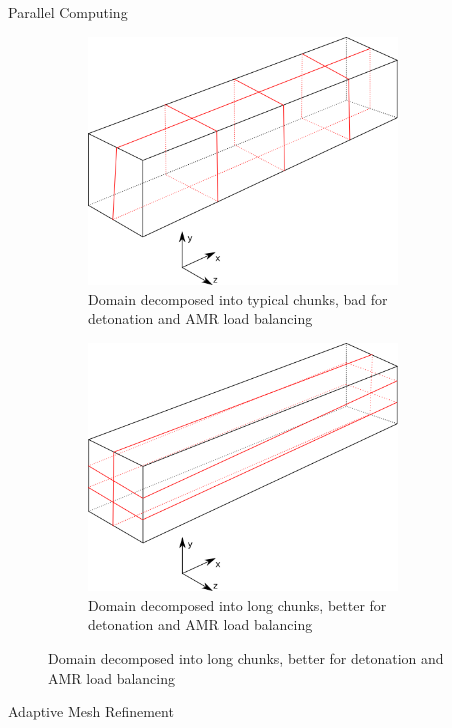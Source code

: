 \begin{frame}[allowframebreaks]{Parallel Computing}
\begin{figure}[p]
    \centering
    \begin{subfigure}[]{0.4\textwidth}
        \centering
        \includegraphics[width=0.9\textwidth]{../figs/parallel_short.png}
        \caption{Domain decomposed into typical chunks, bad for detonation and AMR load balancing}
    \end{subfigure}%
    \begin{subfigure}[]{0.4\textwidth}
        \centering
        \includegraphics[width=0.9\textwidth]{../figs/parallel_long.png}
        \caption{Domain decomposed into long chunks, better for detonation and AMR load balancing}
    \end{subfigure}
\end{figure}%

\end{frame}



\begin{frame}{Adaptive Mesh Refinement}
\end{frame}
